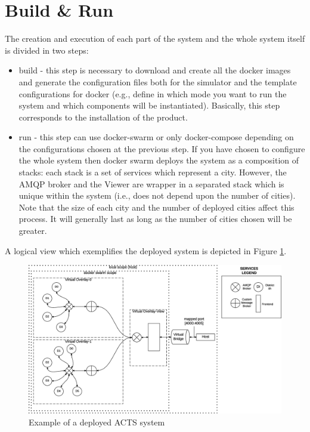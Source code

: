 \section{Build \& Run}
The creation and execution of each part of the system and
the whole system itself is divided in two steps:

\begin{itemize}
   \item build - this step is necessary to download and create all the docker
   images and generate the configuration files both for the simulator and the
   template configurations for docker
   (e.g., define in which mode you want to run the system and
   which components will be instantiated). Basically, this step
   corresponds to the installation of the product.
   \item run - this step can use docker-swarm or only docker-compose depending
   on the configurations chosen at the previous step. If you have chosen
   to configure the whole system then docker swarm deploys the system
   as a composition of stacks: each stack is a set of services which represent
   a city. However, the AMQP broker and the Viewer are wrapper in a separated
   stack which is unique within the system (i.e., does not depend upon the
   number of cities). Note that the size of each city and the number of deployed
   cities affect this process. It will generally last as long as the number of
   cities chosen will be greater.
\end{itemize}

A logical view which exemplifies the deployed system is depicted in Figure
\ref{fig:deploy-sys}.

\begin{figure}[H]
\centering
\includegraphics[scale=0.5,keepaspectratio]{images/user-man/eps/deploy.eps}
\caption{Example of a deployed ACTS system}
\label{fig:deploy-sys}
\end{figure}